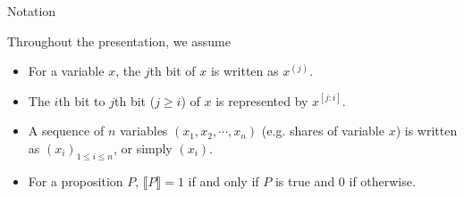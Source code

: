 \begin{frame}{Notation}

Throughout the presentation, we assume
\pause
\begin{itemize}
    \item For a variable $x$, the $j$th bit of $x$ is written as $x^{(j)}$.
    \pause
    \item The $i$th bit to $j$th bit ($j \geq i$) of $x$ is represented by $x^{[j:i]}$.
    \pause
    \item A sequence of $n$ variables $(x_1, x_2, \cdots, x_n)$ (e.g. shares of variable $x$) is written as $(x_i)_{1 \leq i \leq n}$, or simply $(x_i)$.
    \pause
    \item For a proposition $P$, $\llbracket P \rrbracket = 1$ if and only if $P$ is true and $0$ if otherwise.
\end{itemize}
    
\end{frame}
